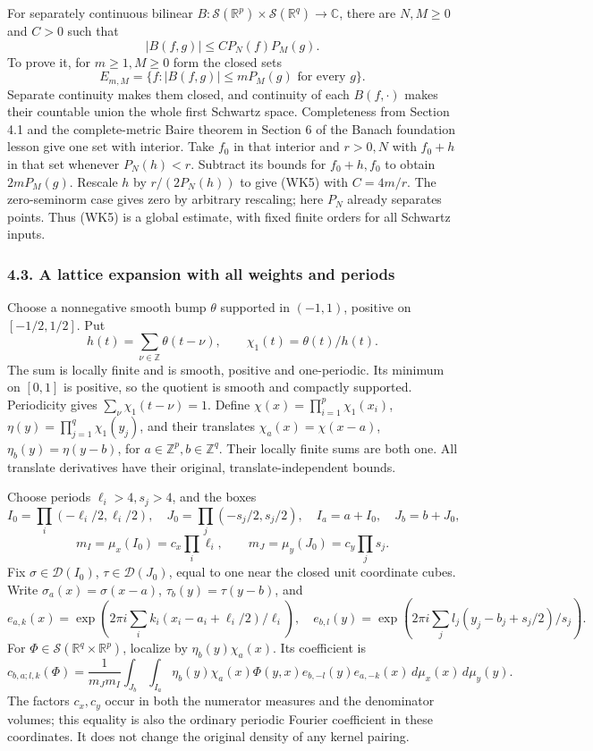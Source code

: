 \documentclass[
  11pt,
]{article}
\begin{document}
For separately continuous bilinear
\(B:\mathcal S(\mathbb R^p)\times\mathcal S(\mathbb R^q)\to\mathbb C\),
there are \(N,M\geq0\) and \(C>0\) such that \[
 |B(f,g)|\leq C P_N(f)P_M(g).
 \tag{WK5}
\] To prove it, for \(m\geq1,M\geq0\) form the closed sets \[
 E_{m,M}=\{f:|B(f,g)|\leq mP_M(g)\text{ for every }g\}.
 \tag{WK6}
\] Separate continuity makes them closed, and continuity of each
\(B(f,\cdot)\) makes their countable union the whole first Schwartz
space. Completeness from Section 4.1 and the complete-metric Baire
theorem in Section 6 of the Banach foundation lesson give one set with
interior. Take \(f_0\) in that interior and \(r>0,N\) with \(f_0+h\) in
that set whenever \(P_N(h)<r\). Subtract its bounds for \(f_0+h,f_0\) to
obtain \(2mP_M(g)\). Rescale \(h\) by \(r/(2P_N(h))\) to give (WK5) with
\(C=4m/r\). The zero-seminorm case gives zero by arbitrary rescaling;
here \(P_N\) already separates points. Thus (WK5) is a global estimate,
with fixed finite orders for all Schwartz inputs.

\subsubsection{4.3. A lattice expansion with all weights and
periods}\label{a-lattice-expansion-with-all-weights-and-periods}

Choose a nonnegative smooth bump \(\theta\) supported in \((-1,1)\),
positive on \([-1/2,1/2]\). Put \[
 h(t)=\sum_{\nu\in\mathbb Z}\theta(t-\nu),\qquad
 \chi_1(t)=\theta(t)/h(t).
 \tag{WK7}
\] The sum is locally finite and is smooth, positive and one-periodic.
Its minimum on \([0,1]\) is positive, so the quotient is smooth and
compactly supported. Periodicity gives \(\sum_\nu\chi_1(t-\nu)=1\).
Define \(\chi(x)=\prod_{i=1}^p\chi_1(x_i)\),
\(\eta(y)=\prod_{j=1}^q\chi_1(y_j)\), and their translates
\(\chi_a(x)=\chi(x-a)\), \(\eta_b(y)=\eta(y-b)\), for
\(a\in\mathbb Z^p,b\in\mathbb Z^q\). Their locally finite sums are both
one. All translate derivatives have their original,
translate-independent bounds.

Choose periods \(\ell_i>4,s_j>4\), and the boxes \[
 I_0=\prod_i(-\ell_i/2,\ell_i/2),\quad
 J_0=\prod_j(-s_j/2,s_j/2),\quad
 I_a=a+I_0,\quad J_b=b+J_0,
\] \[
 m_I=\mu_x(I_0)=c_x\prod_i\ell_i,\qquad
 m_J=\mu_y(J_0)=c_y\prod_j s_j.
 \tag{WK8}
\] Fix \(\sigma\in\mathcal D(I_0)\), \(\tau\in\mathcal D(J_0)\), equal
to one near the closed unit coordinate cubes. Write
\(\sigma_a(x)=\sigma(x-a)\), \(\tau_b(y)=\tau(y-b)\), and \[
 e_{a,k}(x)=
   \exp\!\left(2\pi i\sum_i k_i(x_i-a_i+\ell_i/2)/\ell_i\right),
\quad
 e_{b,l}(y)=
   \exp\!\left(2\pi i\sum_j l_j(y_j-b_j+s_j/2)/s_j\right).
 \tag{WK9}
\] For \(\Phi\in\mathcal S(\mathbb R^q\times\mathbb R^p)\), localize by
\(\eta_b(y)\chi_a(x)\). Its coefficient is \[
 c_{b,a;l,k}(\Phi)=\frac1{m_Jm_I}
 \int_{J_b}\int_{I_a}
     \eta_b(y)\chi_a(x)\Phi(y,x)e_{b,-l}(y)e_{a,-k}(x)
                 \,d\mu_x(x)\,d\mu_y(y).
 \tag{WK10}
\] The factors \(c_x,c_y\) occur in both the numerator measures and the
denominator volumes; this equality is also the ordinary periodic Fourier
coefficient in these coordinates. It does not change the original
density of any kernel pairing.
\end{document}
